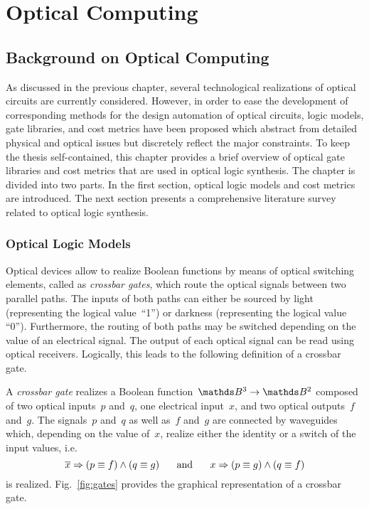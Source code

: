 \documentclass[10pt,letterpaper,twoside,openright]{book}
\begin{document}

\part{Optical Computing}
\chapter{Background on Optical Computing}

As discussed in the previous chapter, several technological realizations of optical circuits are currently considered. However, in order to ease the development of corresponding methods for the design automation of optical circuits, logic models, gate libraries, and cost metrics have been proposed which abstract from detailed physical and optical issues but discretely reflect the major constraints. To keep the thesis self-contained, this chapter provides a brief overview of optical gate libraries and cost metrics that are used in optical logic synthesis. The chapter is divided into two parts. In the first section, optical logic models and cost metrics are introduced. The next section presents a comprehensive literature survey related to optical logic synthesis.
  
\section{Optical Logic Models}

Optical devices allow to realize Boolean functions by means of optical switching elements, called as \emph{crossbar gates}, which route the optical
signals between two parallel paths. The inputs of both paths can either be
sourced by light (representing the logical value~``1'') or darkness (representing the logical value ``0''). Furthermore, the routing of both paths may be switched depending on the value of
an electrical signal. The output of each optical signal can be read using optical receivers. Logically, this leads to the following definition of a crossbar gate.

\begin{definition}
\label{def:crossbar}
A \emph{crossbar gate} realizes a Boolean 
function~$\B^3\rightarrow\B^2$ composed of two optical inputs~$p$ and~$q$, one 
electrical input~$x$, and two optical outputs~$f$ and~$g$. The signals~$p$ and~$q$
as well as~$f$ and~$g$ are connected by waveguides which, depending on the value of~$x$, realize either the identity
or a switch of the input values, i.e.~
$$\overline{x}\Rightarrow (p\equiv f) \wedge (q\equiv g) \mbox{\hspace{.5cm} and \hspace{.5cm}} x\Rightarrow (p\equiv g) \wedge (q\equiv f)$$
is realized. Fig.~\ref{fig:gates} provides the graphical representation of a crossbar gate.
\end{definition}
\end{document}
